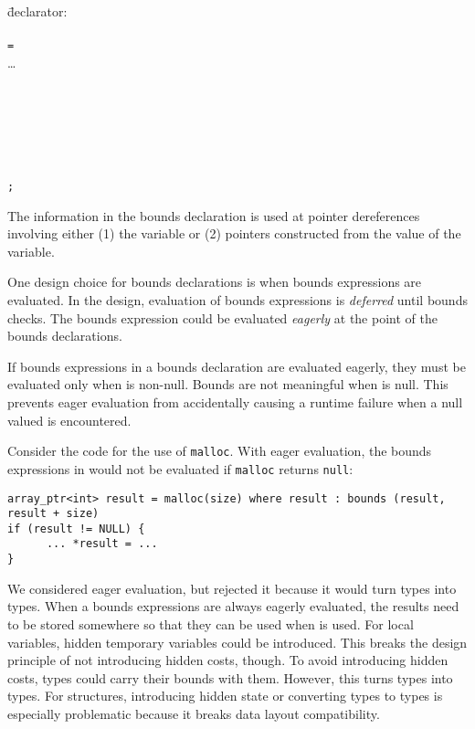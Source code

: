 \begin{tabbing}
\={declarator:} \\
\> \\
\> \texttt{=}  \\
\>\ldots{} \\
\\
 \\
\> \\
\> \\
\\
\\
\>\texttt{;}
\end{tabbing}

The information in the bounds declaration is used at pointer
dereferences involving either (1) the variable or (2) pointers
constructed from the value of the variable.

One design choice for bounds declarations is when
bounds expressions are evaluated.  In the design, evaluation of
bounds expressions is {\em deferred} until bounds checks.  The bounds
expression could be evaluated {\em eagerly} at the point of the bounds declarations.

If bounds expressions in a bounds declaration  are evaluated 
eagerly, they must  be evaluated only when  is non-null.  Bounds are not
meaningful when  is null.  This prevents eager evaluation from accidentally
causing a runtime failure when a null valued is encountered.    

Consider the code for the use of \texttt{malloc}.   With eager evaluation,
the bounds expressions in {\texttt{}} would not
be evaluated if \texttt{malloc} returns \texttt{null}:
\begin{verbatim}
array_ptr<int> result = malloc(size) where result : bounds (result, result + size)
if (result != NULL) {
      ... *result = ...
}
\end{verbatim}

We considered eager evaluation, but rejected it because it would turn \arrayptr
types into \arrayview types.   When a bounds expressions are always eagerly
evaluated, the results need to be stored somewhere so that they can be used
when  is used.  For local variables, hidden temporary variables could be
introduced.   This breaks the design principle of not introducing hidden
costs, though.  To avoid introducing hidden costs, \arrayptr types could carry
their bounds with them.  However, this turns \arrayptr types into \arrayview types.
For structures, introducing hidden state or converting \arrayptr types to \arrayview
types is especially problematic because it breaks data layout compatibility.

